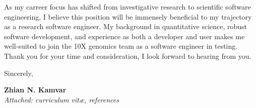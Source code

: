 \vspace{1ex}

As my carreer focus has shifted from investigative research to scientific
software engineering, I believe this position will be immensely beneficial to my
trajectory as a research software engineer. My background in quantitative
science, robust software development, and experience as both a developer and 
user makes me well-suited to join the 10X genomics team as a software engineer
in testing. Thank you for your time and consideration, I look forward to
hearing from you. 

\vspace{2ex}

Sincerely,

\vspace{5ex}

\textbf{Zhian N. Kamvar}\\
\textit{Attached: curriculum vit\ae{}, references}













\clearpage
